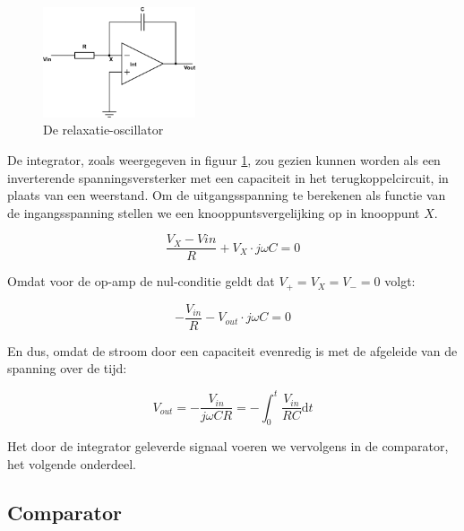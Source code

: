 \documentclass{report}
\begin{document}
\begin{figure}
	\centering
	\includegraphics[width=0.4\textwidth]{integrator.png}
	\caption{De relaxatie-oscillator}
	\label{fig:int}
\end{figure}

De integrator, zoals weergegeven in figuur \ref{fig:int}, zou gezien kunnen worden als een inverterende spanningsversterker met een capaciteit in het terugkoppelcircuit, in plaats van een weerstand. Om de uitgangsspanning te berekenen als functie van de ingangsspanning stellen we een knooppuntsvergelijking op in knooppunt $X$.

$$\frac{V_{X} - V{in}}{R} + V_{X} \cdot j\omega C = 0$$

\noindent
Omdat voor de op-amp de nul-conditie geldt dat $V_{+} = V_{X} = V_{-} = 0$ volgt:

$$-\frac{V_{in}}{R} - V_{out} \cdot j\omega C = 0$$

\noindent
En dus, omdat de stroom door een capaciteit evenredig is met de afgeleide van de spanning over de tijd:

\begin{equation}
	V_{out} = -\frac{V_{in}}{j\omega CR} = -\int_0^t \frac{V_{in}}{RC} \mathrm{d}t
	\label{eq:integrator}
\end{equation}

\noindent
Het door de integrator geleverde signaal voeren we vervolgens in de comparator, het volgende onderdeel.

\subsection{Comparator}
\end{document}
